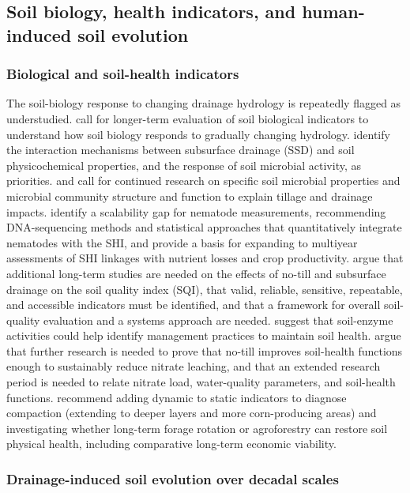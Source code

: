 \subsection{Soil biology, health indicators, and human-induced soil evolution}

\subsubsection{Biological and soil-health indicators}

The soil-biology response to changing drainage hydrology is repeatedly flagged as understudied. \textcite{Sherbine2023} call for longer-term evaluation of soil biological indicators to understand how soil biology responds to gradually changing hydrology. \textcite{Yang2025} identify the interaction mechanisms between subsurface drainage (SSD) and soil physicochemical properties, and the response of soil microbial activity, as priorities. \textcite{Kaur2024b} and \textcite{Kumar2014} call for continued research on specific soil microbial properties and microbial community structure and function to explain tillage and drainage impacts. \textcite{Li2023b} identify a scalability gap for nematode measurements, recommending DNA-sequencing methods and statistical approaches that quantitatively integrate nematodes with the SHI, and provide a basis for expanding to multiyear assessments of SHI linkages with nutrient losses and crop productivity. \textcite{Nakajima2015} argue that additional long-term studies are needed on the effects of no-till and subsurface drainage on the soil quality index (SQI), that valid, reliable, sensitive, repeatable, and accessible indicators must be identified, and that a framework for overall soil-quality evaluation and a systems approach are needed. \textcite{Singh2007} suggest that soil-enzyme activities could help identify management practices to maintain soil health. \textcite{Masri2024} argue that further research is needed to prove that no-till improves soil-health functions enough to sustainably reduce nitrate leaching, and that an extended research period is needed to relate nitrate load, water-quality parameters, and soil-health functions. \textcite{Caron2025} recommend adding dynamic to static indicators to diagnose compaction (extending to deeper layers and more corn-producing areas) and investigating whether long-term forage rotation or agroforestry can restore soil physical health, including comparative long-term economic viability.

\subsubsection{Drainage-induced soil evolution over decadal scales}

